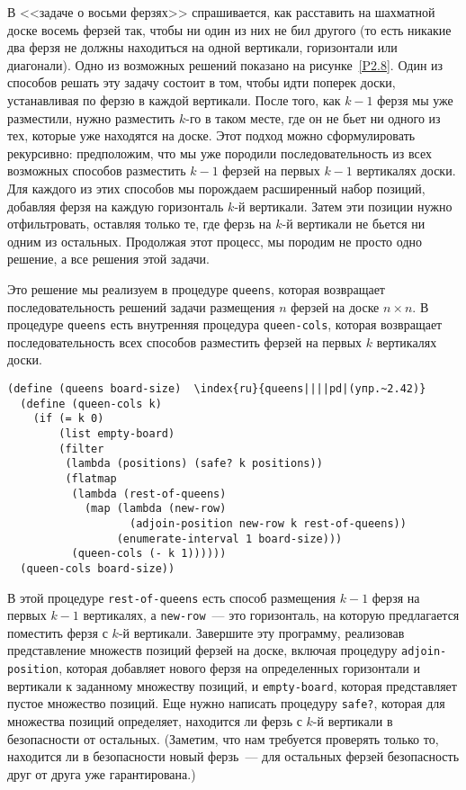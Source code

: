 \begin{exercise}{2.42}\label{EX2.42}%
%
%
%
%
В <<задаче о восьми ферзях>> спрашивается, как
расставить на шахматной доске восемь ферзей так, чтобы ни один из них
не бил другого (то есть никакие два ферзя не должны находиться на
одной вертикали, горизонтали или диагонали).  Одно из возможных
решений показано на рисунке~\ref{P2.8}.  Один из способов
решать эту задачу состоит в том, чтобы идти поперек доски,
устанавливая по ферзю в каждой вертикали. После того, как
$k-1$ ферзя мы уже разместили, нужно разместить
$k$-го в таком месте, где он не бьет ни одного из тех,
которые уже находятся на доске.  Этот подход можно сформулировать
рекурсивно: предположим, что мы уже породили последовательность из
всех возможных способов разместить $k-1$ ферзей на первых
$k-1$ вертикалях доски.  Для каждого из этих способов мы
порождаем расширенный набор позиций, добавляя ферзя на каждую
горизонталь $k$-й вертикали.  Затем эти позиции нужно
отфильтровать, оставляя только те, где ферзь на $k$-й
вертикали не бьется ни одним из остальных.  Продолжая этот процесс, мы 
породим не просто одно решение, а все решения этой задачи.

Это решение мы реализуем в процедуре
{\tt queens}, которая возвращает последовательность решений
задачи размещения $n$ ферзей на доске $n \times
n$. В процедуре {\tt queens} есть внутренняя процедура
{\tt queen-cols}, которая возвращает последовательность всех
способов разместить ферзей на первых $k$ вертикалях доски.

\begin{Verbatim}[fontsize=\small]
(define (queens board-size)  \index{ru}{queens||||pd|(упр.~2.42)}
  (define (queen-cols k)
    (if (= k 0)
        (list empty-board)
        (filter
         (lambda (positions) (safe? k positions))
         (flatmap
          (lambda (rest-of-queens)
            (map (lambda (new-row)
                   (adjoin-position new-row k rest-of-queens))
                 (enumerate-interval 1 board-size)))
          (queen-cols (- k 1))))))
  (queen-cols board-size))
\end{Verbatim}
В этой процедуре {\tt rest-of-queens} есть способ размещения
$k-1$ ферзя на первых $k-1$ вертикалях, а
{\tt new-row}~--- это горизонталь, на которую предлагается
поместить ферзя с $k$-й вертикали.  Завершите эту
программу, реализовав представление множеств позиций ферзей на доске, включая 
процедуру {\tt adjoin-position}, которая добавляет нового ферзя 
на определенных горизонтали и вертикали к заданному множеству позиций, 
и {\tt empty-board}, которая представляет пустое множество
позиций.  Еще нужно написать процедуру {\tt safe?}, которая для 
множества позиций определяет, находится ли ферзь с $k$-й
вертикали в безопасности от остальных. (Заметим,
что нам требуется проверять только то, находится ли в безопасности
новый ферзь~--- для остальных ферзей безопасность друг от друга уже
гарантирована.)
\end{exercise}
